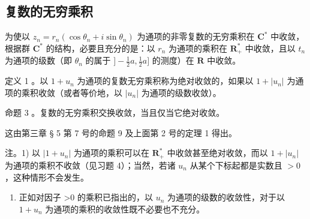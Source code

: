 \subsection{复数的无穷乘积}

为使以 \(z_{n} = r_{n}(\cos \theta_{n} + i\sin \theta_{n})\) 为通项的非零复数的无穷乘积在 \(\mathbf{C}^{*}\) 中收敛，根据群 \(\mathbf{C}^{*}\) 的结构，必要且充分的是：以 \(r_{n}\) 为通项的乘积在 \(\mathbf{R}_{+}^{*}\) 中收敛，且以 \(t_{n}\) 为通项的级数（即 \(\theta_{n}\) 的属于 \(] - \frac{1}{2} a, \frac{1}{2} a]\) 的测度）在 \(\mathbf{R}\) 中收敛。

定义 1 。以 \(1 + u_{n}\) 为通项的复数无穷乘积称为绝对收敛的，如果以 \(1 + |u_{n}|\) 为通项的乘积收敛（或者等价地，以 \(|u_{n}|\) 为通项的级数收敛）。

命题 3 。复数的无穷乘积交换收敛，当且仅当它绝对收敛。

这由第三章 § 5 第 7 号的命题 9 及上面第 2 号的定理 1 得出。

注。1) 以 \(|1 + u_n|\) 为通项的乘积可以在 \(\mathbf{R}_+^*\) 中收敛甚至绝对收敛，而以 \(1 + |u_n|\) 为通项的乘积不收敛（见习题 4）；当然，若诸 \(u_n\) 从某个下标起都是实数且 \(>0\) ，这种情形不会发生。

\begin{enumerate}
\def\labelenumi{\arabic{enumi})}
\setcounter{enumi}{1}
\tightlist
\item
  正如对因子 \textgreater0 的乘积已指出的，以 \(u_{n}\) 为通项的级数的收敛性，对于以 \(1 + u_{n}\) 为通项的乘积的收敛性既不必要也不充分。
\end{enumerate}

